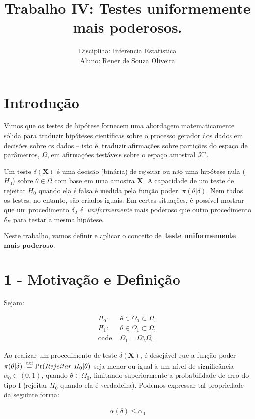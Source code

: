 \documentclass[a4paper,10pt, notitlepage]{report}
\title{Trabalho IV: Testes uniformemente mais poderosos.}
\author{Disciplina: Inferência Estatística \\ Aluno: Rener de Souza Oliveira}
\newcommand{\bX}{\boldsymbol{X}} %
\newcommand{\defn}{\stackrel{\textrm{\scriptsize def}}{=}}
\newcommand{\mysection}[2]{\setcounter{section}{#1}\addtocounter{section}{-1}\section*{#1 - #2}}
\newcommand{\op}{\operatorname}
\begin{document}
	\maketitle

	
	\section*{Introdução}
	
	Vimos que os testes de hipótese fornecem uma abordagem matematicamente sólida para traduzir hipóteses científicas sobre o processo gerador dos dados em decisões sobre os dados -- isto é, traduzir afirmações sobre partições do espaço de parâmetros, $\Omega$, em afirmações testáveis sobre o espaço amostral $\mathcal{X}^n$.
	
	Um teste $\delta(\bX)$ é uma decisão (binária) de rejeitar ou não uma hipótese nula ($H_0$) sobre $\theta \in \Omega$ com base em uma amostra $\bX$.
	A capacidade de um teste de rejeitar $H_0$ quando ela é falsa é medida pela função poder, $\pi(\theta |\delta)$.
	Nem todos os testes, no entanto, são criados iguais.
	Em certas situações, é possível mostrar que um procedimento $\delta_A$ é~\textit{uniformemente} mais poderoso que outro procedimento $\delta_B$ para testar a mesma hipótese.
	
	Neste trabalho, vamos definir e aplicar o conceito de~\textbf{teste uniformemente mais poderoso}.
	
	\mysection{1}{Motivação e Definição}
	
	Sejam:
	
	\begin{align}
	\label{h0h1}
	 H_0:& \theta \in \Omega_0\subset \Omega,\nonumber\\
	 H_1:& \theta \in \Omega_1\subset \Omega,\\
	 \text{onde } &\Omega_1= \Omega \setminus \Omega_0\nonumber
	\end{align}
	
	
	Ao realizar um procedimento de teste $\delta(\bX)$, é desejável que a função poder $\pi(\theta|\delta):\defn \op{Pr}(Rejeitar ~H_0|\theta)$ seja menor ou igual à um nível de significância $\alpha_0\in (0,1)$, quando $\theta\in\Omega_0$, limitando superiormente a probabilidade de erro do tipo I (rejeitar $H_0$ quando ela é verdadeira). Podemos expressar tal propriedade da seguinte forma:
	
	\begin{align*}
		\alpha(\delta)\leq \alpha_0
	\end{align*}
	
\end{document}
